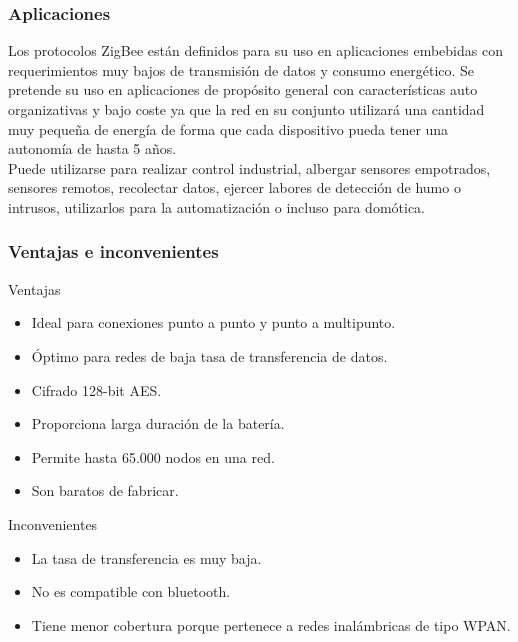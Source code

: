 \documentclass[10pt,a4paper,spanish]{beamer}
\begin{document}
\begin{frame}
	\frametitle{Aplicaciones}
	Los protocolos ZigBee están definidos para su uso en aplicaciones embebidas con requerimientos muy bajos de transmisión de datos y consumo energético. Se pretende su uso en aplicaciones de propósito general con características auto organizativas y bajo coste ya que la red en su conjunto utilizará una cantidad muy pequeña de energía de forma que cada dispositivo pueda tener una autonomía de hasta 5 años.\\

	\vspace{0.25cm}
	Puede utilizarse para realizar control industrial, albergar sensores empotrados, sensores remotos, recolectar datos, ejercer labores de detección de humo o intrusos, utilizarlos para la automatización o incluso para domótica.
\end{frame}

\begin{frame}
	\frametitle{Ventajas e inconvenientes}
	\begin{block}{Ventajas}
		\begin{itemize}
			\item Ideal para conexiones punto a punto y punto a multipunto.
			\item Óptimo para redes de baja tasa de transferencia de datos.
			\item Cifrado 128-bit AES.
			\item Proporciona larga duración de la batería.
			\item Permite hasta 65.000 nodos en una red.
			\item Son baratos de fabricar.
		\end{itemize}
	\end{block}
	\begin{block}{Inconvenientes}
		\begin{itemize}
			\item La tasa de transferencia es muy baja.
			\item No es compatible con bluetooth.
			\item Tiene menor cobertura porque pertenece a redes inalámbricas de tipo WPAN.
		\end{itemize}
	\end{block}
\end{frame}
\end{document}
